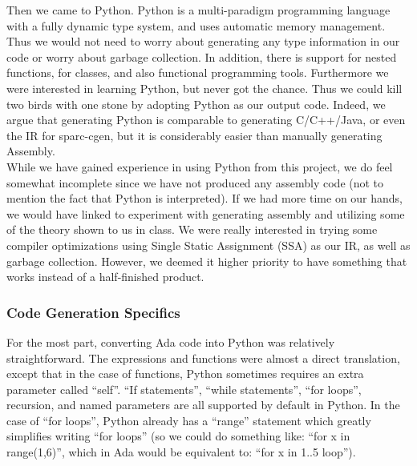 \documentclass[onecolumn,11pt]{article}
\begin{document}
Then we came to Python. Python is a multi-paradigm programming language with a fully dynamic type system, and uses automatic memory management. Thus we would not need to worry about generating any type information in our code or worry about garbage collection. In addition, there is support for nested functions, for classes, and also functional programming tools. Furthermore we were interested in learning Python, but never got the chance. Thus we could kill two birds with one stone by adopting Python as our output code. Indeed, we argue that generating Python is comparable to generating C/C++/Java, or even the IR for sparc-cgen, but it is considerably easier than manually generating Assembly. \\

While we have gained experience in using Python from this project, we do feel somewhat incomplete since we have not produced any assembly code (not to mention the fact that Python is interpreted). If we had more time on our hands, we would have linked to experiment with generating assembly and utilizing some of the theory shown to us in class. We were really interested in trying some compiler optimizations using Single Static Assignment (SSA) as our IR, as well as garbage collection. However, we deemed it higher priority to have something that works instead of a half-finished product.

\subsubsection{Code Generation Specifics}
For the most part, converting Ada code into Python was relatively straightforward. The expressions and functions were almost a direct translation, except that in the case of functions, Python sometimes requires an extra parameter called ``self''. ``If statements'', ``while statements'', ``for loops'', recursion, and named parameters are all supported by default in Python. In the case of ``for loops'', Python already has a ``range'' statement which greatly simplifies writing ``for loops'' (so we could do something like: ``for x in range(1,6)'', which in Ada would be equivalent to: ``for x in 1..5 loop''). \\
\end{document}
